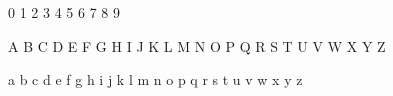 \documentclass[10pt,border=10pt]{article}
\begin{document}
\thispagestyle{empty}




0\hfill
1\hfill
2\hfill
3\hfill
4\hfill
5\hfill
6\hfill
7\hfill
8\hfill
9\hfill

\vspace{1em}

A\hfill
B\hfill
C\hfill
D\hfill
E\hfill
F\hfill
G\hfill
H\hfill
I\hfill
J\hfill
K\hfill
L\hfill
M\hfill
N\hfill
O\hfill
P\hfill
Q\hfill
R\hfill
S\hfill
T\hfill
U\hfill
V\hfill
W\hfill
X\hfill
Y\hfill
Z\hfill

\vspace{1em}

a\hfill
b\hfill
c\hfill
d\hfill
e\hfill
f\hfill
g\hfill
h\hfill
i\hfill
j\hfill
k\hfill
l\hfill
m\hfill
n\hfill
o\hfill
p\hfill
q\hfill
r\hfill
s\hfill
t\hfill
u\hfill
v\hfill
w\hfill
x\hfill
y\hfill
z\hfill
\end{document}
